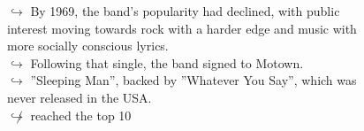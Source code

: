 \documentclass[11pt,a4paper, onecolumn]{article}
\begin{document}
\begin{figure}[t] \small \begin{tcolorbox}[boxsep=0pt,left=5pt,right=0pt,top=2pt,colback = yellow!5] \begin{dialogue}
 \small 
\colorbox{pink!25}{$\hookrightarrow$}
{ By 1969, the band's popularity had declined, with public interest moving towards rock with a harder edge and music with more socially conscious lyrics. }
\\
\colorbox{pink!25}{$\hookrightarrow$}
{ Following that single, the band signed to Motown. }
\\
\colorbox{pink!25}{$\hookrightarrow$}
{ ''Sleeping Man'', backed by ''Whatever You Say'', which was never released in the USA. }
\\
\colorbox{pink!25}{$\not\hookrightarrow$}
{ reached the top 10 }
\\
 \end{dialogue}\end{tcolorbox}\end{figure}
\end{document}
